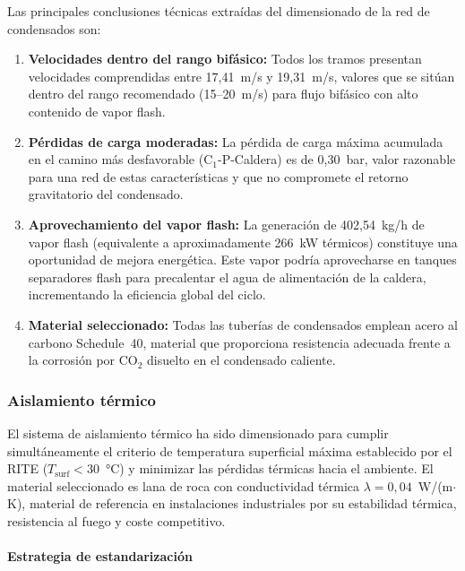 Las principales conclusiones técnicas extraídas del dimensionado de la red de condensados son:

\begin{enumerate}[label=\arabic*., leftmargin=2em]
	\item \textbf{Velocidades dentro del rango bifásico:} Todos los tramos presentan velocidades comprendidas entre 17,41~m/s y 19,31~m/s, valores que se sitúan dentro del rango recomendado (15--20~m/s) para flujo bifásico con alto contenido de vapor flash.

	\item \textbf{Pérdidas de carga moderadas:} La pérdida de carga máxima acumulada en el camino más desfavorable (C$_1$-P-Caldera) es de 0,30~bar, valor razonable para una red de estas características y que no compromete el retorno gravitatorio del condensado.

	\item \textbf{Aprovechamiento del vapor flash:} La generación de 402,54~kg/h de vapor flash (equivalente a aproximadamente 266~kW térmicos) constituye una oportunidad de mejora energética. Este vapor podría aprovecharse en tanques separadores flash para precalentar el agua de alimentación de la caldera, incrementando la eficiencia global del ciclo.

	\item \textbf{Material seleccionado:} Todas las tuberías de condensados emplean acero al carbono Schedule~40, material que proporciona resistencia adecuada frente a la corrosión por CO$_2$ disuelto en el condensado caliente.
\end{enumerate}

\subsubsection{Aislamiento térmico}
\label{subsubsec:conclusiones-aislamiento}

El sistema de aislamiento térmico ha sido dimensionado para cumplir simultáneamente el criterio de temperatura superficial máxima establecido por el RITE ($T_{\text{surf}} < 30$~°C) y minimizar las pérdidas térmicas hacia el ambiente. El material seleccionado es lana de roca con conductividad térmica $\lambda = 0{,}04$~W/(m$\cdot$K), material de referencia en instalaciones industriales por su estabilidad térmica, resistencia al fuego y coste competitivo.

\paragraph{Estrategia de estandarización}

